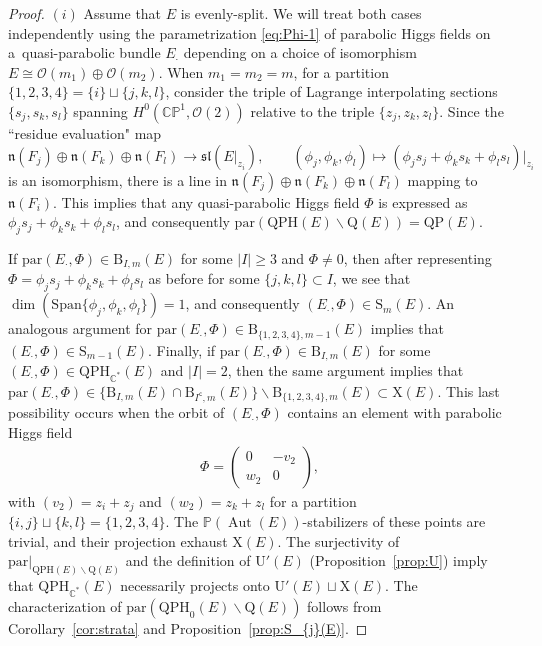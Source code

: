 \documentclass[10pt,a4paper]{amsart}
\newcommand{\field}[1]{\ensuremath{\mathbb{#1}}}
\newcommand{\CC}{\field{C}}
\newcommand{\PP}{\field{P}}
\newcommand{\calO}{\mathcal{O}}
\newcommand{\qp}{\boldsymbol{\cdot}}
\DeclareMathOperator{\Aut}{Aut}
\numberwithin{equation}{section}
\begin{document}
\begin{proof}
{\sloppy $(i)$ Assume that $E$ is evenly-split. We will treat both cases independently using the parametrization \eqref{eq:Phi-1} of parabolic Higgs fields on a~quasi-parabolic bundle $E_{\qp}$ depen\-ding on a choice of isomorphism $E\cong\calO(m_{1})\oplus\calO(m_{2})$. When $m_{1}=m_{2} = m$, for a partition $\{1,2,3,4\} = \{i\}\sqcup\{j,k,l\}$, consider the triple of Lagrange interpolating sections $\{s_{j},s_{k},s_{l}\}$ spanning $H^{0}(\CC\PP^{1},\calO(2))$ relative to the triple $\{z_{j},z_{k},z_{l}\}$. Since the ``residue evaluation" map
\[
\mathfrak{n}(F_{j})\oplus\mathfrak{n}(F_{k})\oplus\mathfrak{n}(F_{l}) \rightarrow\mathfrak{sl}(E\vert_{z_{i}}),\qquad
(\phi_{j},\phi_{k},\phi_{l})\mapsto (\phi_{j}s_{j}+\phi_{k}s_{k}+\phi_{l}s_{l})\vert_{z_{i}}
\]}\noindent
is an isomorphism, there is a line in $\mathfrak{n}(F_{j})\oplus\mathfrak{n}(F_{k})\oplus\mathfrak{n}(F_{l})$ mapping to $\mathfrak{n}(F_{i})$. This implies that any quasi-parabolic Higgs field $\Phi$ is expressed as $\phi_{j}s_{j}+\phi_{k}s_{k}+\phi_{l}s_{l}$, and consequently $\mathrm{par}(\mathrm{QPH}(E)\backslash\mathrm{Q}(E)) = \mathrm{QP}(E)$.

If $\mathrm{par}(E_{\qp},\Phi)\in\mathrm{B}_{I,m}(E)$ for some $\vert I\vert \geq 3$ and $\Phi \neq 0$, then after representing $\Phi = \phi_{j}s_{j}+\phi_{k}s_{k}+\phi_{l}s_{l}$ as before for some $\{j,k,l\}\subset I$, we see that $\dim (\mathrm{Span}\{\phi_{j},\phi_{k},\phi_{l}\}) = 1$, and consequently $(E_{\qp},\Phi)\in\mathrm{S}_{m}(E)$. An analogous argument for $\mathrm{par}(E_{\qp},\Phi)\in\mathrm{B}_{\{1,2,3,4\},m-1}(E)$ implies that $(E_{\qp},\Phi)\in\mathrm{S}_{m-1}(E)$. Finally, if $\mathrm{par}(E_{\qp},\Phi)\in\mathrm{B}_{I,m}(E)$ for some $(E_{\qp},\Phi)\in\mathrm{QPH}_{\CC^{*}}(E)$ and $\vert I\vert = 2$, then the same argument implies that $\mathrm{par}(E_{\qp},\Phi)\in\{\mathrm{B}_{I,m}(E)\cap \mathrm{B}_{I^{\mathsf{c}},m}(E)\}\backslash\mathrm{B}_{\{1,2,3,4\},m}(E)\subset \mathrm{X}(E)$. This last possibility occurs when the orbit of $(E_{\qp},\Phi)$ contains an element with parabolic Higgs field
\begin{gather}\label{eq:HX-0}
\Phi = \begin{pmatrix}
0 & -v_{2}\\
w_{2} & 0
\end{pmatrix}\!,
\end{gather}
with $(v_{2}) = z_{i}+z_{j}$ and $(w_{2}) = z_{k}+z_{l}$ for a partition $\{i,j\}\sqcup\{k,l\} = \{1,2,3,4\}$. The $\PP(\Aut(E))$-stabilizers of these points are trivial, and their projection exhaust $\mathrm{X}(E)$. The surjectivity of $\mathrm{par}\vert_{\mathrm{QPH}(E)\backslash\mathrm{Q}(E)}$ and the definition of $\mathrm{U}'(E)$ (Proposition~\ref{prop:U}) imply that $\mathrm{QPH}_{\CC^{*}}(E)$ necessa\-rily projects onto $\mathrm{U}'(E)\sqcup \mathrm{X}(E)$. The characterization of $\mathrm{par}(\mathrm{QPH}_{0}(E)\backslash\mathrm{Q}(E))$ follows from Corollary~\ref{cor:strata} and Proposition~\ref{prop:S_{j}(E)}.


\end{proof}
\end{document}
